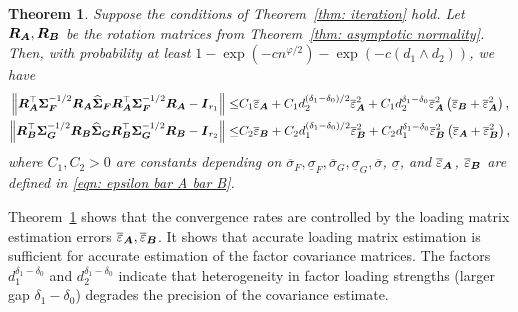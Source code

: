 \documentclass[11pt,letterpaper]{article}
\newtheorem{theorem}{Theorem}[section]
\theoremstyle{definition}
\begin{document}
\begin{theorem}\label{thm: loading scale estimation}
Suppose the conditions of Theorem~\ref{thm: iteration} hold. Let $\boldsymbol{R}_{\boldsymbol{A}}, \boldsymbol{R}_{\boldsymbol{B}}$ be the rotation matrices from Theorem~\ref{thm: asymptotic normality}. Then, with probability at least $1 - \exp(-cn^{\varphi/2})- \exp(-c(d_1 \wedge d_2))$, we have 
\begin{align*}
\left\|\boldsymbol{R}_{\boldsymbol{A}}^{\top}\boldsymbol{\Sigma}_{\boldsymbol{F}}^{-1/2}\boldsymbol{R}_{\boldsymbol{A}}\widehat{\boldsymbol{\Sigma}}_{\boldsymbol{F}} \boldsymbol{R}_{\boldsymbol{A}}^{\top}\boldsymbol{\Sigma}_{\boldsymbol{F}}^{-1/2}\boldsymbol{R}_{\boldsymbol{A}}- \boldsymbol{I}_{r_1}\right\| 
\le & C_1\overline{\varepsilon}_{\boldsymbol{A}} + C_1  d_2^{(\delta_1-\delta_0)/2} \overline{\varepsilon}_{\boldsymbol{A}}^2 + C_1 d_2^{\delta_1-\delta_0} \overline{\varepsilon}_{\boldsymbol{A}}^2 \left(\overline{\varepsilon}_{\boldsymbol{B}}+\overline{\varepsilon}_{\boldsymbol{A}}^2\right) ,  \\
\left\|\boldsymbol{R}_{\boldsymbol{B}}^{\top}\boldsymbol{\Sigma}_{\boldsymbol{G}}^{-1/2}\boldsymbol{R}_{\boldsymbol{B}}\widehat{\boldsymbol{\Sigma}}_{\boldsymbol{G}} \boldsymbol{R}_{\boldsymbol{B}}^{\top}\boldsymbol{\Sigma}_{\boldsymbol{G}}^{-1/2}\boldsymbol{R}_{\boldsymbol{B}}- \boldsymbol{I}_{r_2}\right\| 
\le & C_2\overline{\varepsilon}_{\boldsymbol{B}} + C_2 d_1^{(\delta_1-\delta_0)/2} \overline{\varepsilon}_{\boldsymbol{B}}^2 + C_2 d_1^{\delta_1-\delta_0}  \overline{\varepsilon}_{\boldsymbol{B}}^2 \left(\overline{\varepsilon}_{\boldsymbol{A}}+\overline{\varepsilon}_{\boldsymbol{B}}^2\right) ,
\end{align*}
where $C_1,C_2>0$ are constants depending on $\overline{\sigma}_{F}, \underline{\sigma}_{ F}, \overline{\sigma}_{G}, \underline{\sigma}_{G}, \overline{\sigma}$, $\underline{\sigma}$, and $\overline{\varepsilon}_{\boldsymbol{A}}$, $\overline{\varepsilon}_{\boldsymbol{B}}$ are defined in \eqref{eqn: epsilon bar A bar B}. 
\end{theorem}


Theorem~\ref{thm: loading scale estimation} shows that the convergence rates are controlled by the loading matrix estimation errors $\overline{\varepsilon}_{\boldsymbol{A}},\overline{\varepsilon}_{\boldsymbol{B}}$. It shows that accurate loading matrix estimation is sufficient for accurate estimation of the factor covariance matrices. The factors $d_1^{\delta_1-\delta_0}$ and $d_2^{\delta_1-\delta_0}$ indicate that heterogeneity in factor loading strengths (larger gap $\delta_1-\delta_0$) degrades the precision of the covariance estimate.
\end{document}
